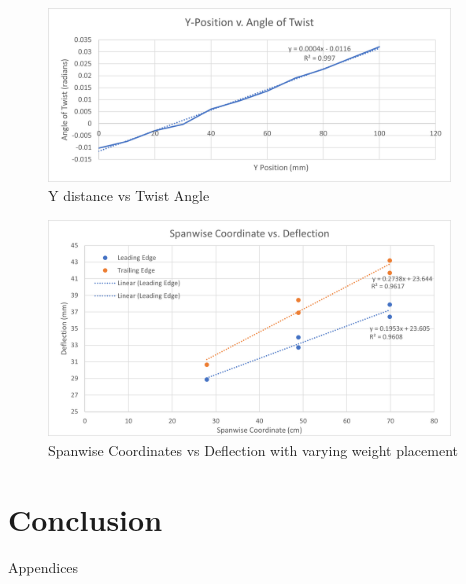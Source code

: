 \documentclass{article}
\begin{document}
\begin{figure}[hbtp]
  \centering
  \includegraphics[width=0.95\textwidth]{lab3images/YvsTwist.png}
  \caption{Y distance vs Twist Angle}
  \label{fig:YvsTwist}
\end{figure}


\begin{figure}[hbtp]
  \centering
  \includegraphics[width=0.95\textwidth]{lab3images/SpanwiseDeflection.png}
  \caption{Spanwise Coordinates vs Deflection with varying weight placement}
  \label{fig:SpanwiseDeflection}
\end{figure}


\section{Conclusion}

\newpage
\thispagestyle{empty}  %
\begin{center}
	\vspace*{\fill}
	{\Huge Appendices}
	\vspace*{\fill}
\end{center}
\end{document}
